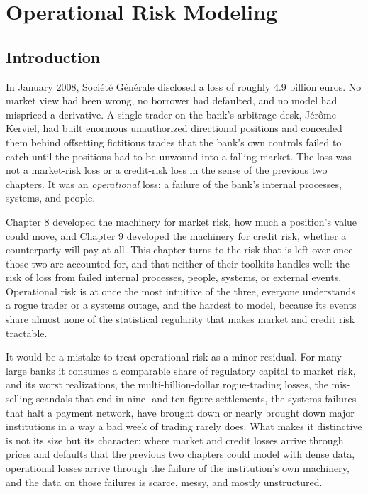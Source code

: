 \documentclass[../ai_in_finance]{subfiles}
\begin{document}
\chapter{Operational Risk Modeling}

\section{Introduction}

In January 2008, Société Générale disclosed a loss of roughly 4.9 billion euros. No market view had been wrong, no borrower had defaulted, and no model had mispriced a derivative. A single trader on the bank's arbitrage desk, Jérôme Kerviel, had built enormous unauthorized directional positions and concealed them behind offsetting fictitious trades that the bank's own controls failed to catch until the positions had to be unwound into a falling market. The loss was not a market-risk loss or a credit-risk loss in the sense of the previous two chapters. It was an \emph{operational} loss: a failure of the bank's internal processes, systems, and people.

Chapter 8 developed the machinery for market risk, how much a position's value could move, and Chapter 9 developed the machinery for credit risk, whether a counterparty will pay at all. This chapter turns to the risk that is left over once those two are accounted for, and that neither of their toolkits handles well: the risk of loss from failed internal processes, people, systems, or external events. Operational risk is at once the most intuitive of the three, everyone understands a rogue trader or a systems outage, and the hardest to model, because its events share almost none of the statistical regularity that makes market and credit risk tractable.

It would be a mistake to treat operational risk as a minor residual. For many large banks it consumes a comparable share of regulatory capital to market risk, and its worst realizations, the multi-billion-dollar rogue-trading losses, the mis-selling scandals that end in nine- and ten-figure settlements, the systems failures that halt a payment network, have brought down or nearly brought down major institutions in a way a bad week of trading rarely does. What makes it distinctive is not its size but its character: where market and credit losses arrive through prices and defaults that the previous two chapters could model with dense data, operational losses arrive through the failure of the institution's own machinery, and the data on those failures is scarce, messy, and mostly unstructured.
\end{document}

